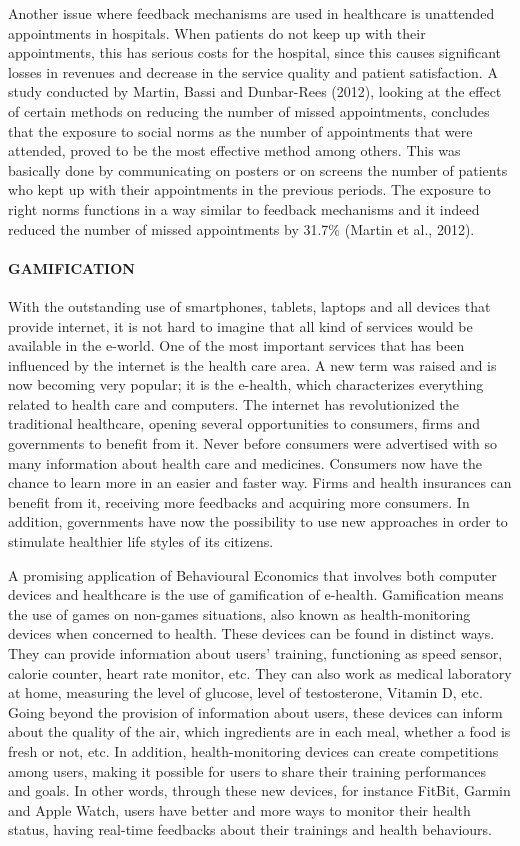 \documentclass[]{article}
\let\oldparagraph\paragraph
\renewcommand{\paragraph}[1]{\oldparagraph{#1}\mbox{}}
\begin{document}
Another issue where feedback mechanisms are used in healthcare is
unattended appointments in hospitals. When patients do not keep up with
their appointments, this has serious costs for the hospital, since this
causes significant losses in revenues and decrease in the service
quality and patient satisfaction. A study conducted by Martin, Bassi and
Dunbar-Rees (2012), looking at the effect of certain methods on reducing
the number of missed appointments, concludes that the exposure to social
norms as the number of appointments that were attended, proved to be the
most effective method among others. This was basically done by
communicating on posters or on screens the number of patients who kept
up with their appointments in the previous periods. The exposure to
right norms functions in a way similar to feedback mechanisms and it
indeed reduced the number of missed appointments by 31.7\% (Martin et
al., 2012).

\paragraph{GAMIFICATION}\label{gamification}

With the outstanding use of smartphones, tablets, laptops and all
devices that provide internet, it is not hard to imagine that all kind
of services would be available in the e-world. One of the most important
services that has been influenced by the internet is the health care
area. A new term was raised and is now becoming very popular; it is the
e-health, which characterizes everything related to health care and
computers. The internet has revolutionized the traditional healthcare,
opening several opportunities to consumers, firms and governments to
benefit from it. Never before consumers were advertised with so many
information about health care and medicines. Consumers now have the
chance to learn more in an easier and faster way. Firms and health
insurances can benefit from it, receiving more feedbacks and acquiring
more consumers. In addition, governments have now the possibility to use
new approaches in order to stimulate healthier life styles of its
citizens.

A promising application of Behavioural Economics that involves both
computer devices and healthcare is the use of gamification of e-health.
Gamification means the use of games on non-games situations, also known
as health-monitoring devices when concerned to health. These devices can
be found in distinct ways. They can provide information about users'
training, functioning as speed sensor, calorie counter, heart rate
monitor, etc. They can also work as medical laboratory at home,
measuring the level of glucose, level of testosterone, Vitamin D, etc.
Going beyond the provision of information about users, these devices can
inform about the quality of the air, which ingredients are in each meal,
whether a food is fresh or not, etc. In addition, health-monitoring
devices can create competitions among users, making it possible for
users to share their training performances and goals. In other words,
through these new devices, for instance FitBit, Garmin and Apple Watch,
users have better and more ways to monitor their health status, having
real-time feedbacks about their trainings and health behaviours.
\end{document}

